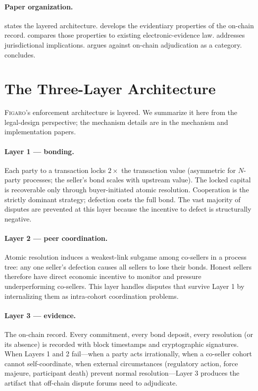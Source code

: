 \documentclass[11pt,a4paper]{article}
\theoremstyle{remark}
\newcommand{\figaro}{\textsc{Figaro}}
\begin{document}
\paragraph{Paper organization.}
 states the layered architecture.
 develops the evidentiary properties of the
on-chain record.  compares those properties to
existing electronic-evidence law.
 addresses jurisdictional implications.
 argues against on-chain adjudication
as a category.  concludes.

\section{The Three-Layer Architecture}
\label{sec:layering}

\figaro{}'s enforcement architecture is layered. We summarize it
here from the legal-design perspective; the mechanism details are
in the mechanism and implementation papers.

\paragraph{Layer 1 --- bonding.}
Each party to a transaction locks $2\times$ the transaction value
(asymmetric for $N$-party processes; the seller's bond scales with
upstream value). The locked capital is recoverable only through
buyer-initiated atomic resolution. Cooperation is the strictly
dominant strategy; defection costs the full bond. The vast
majority of disputes are prevented at this layer because the
incentive to defect is structurally negative.

\paragraph{Layer 2 --- peer coordination.}
Atomic resolution induces a weakest-link subgame among
co-sellers in a process tree: any one seller's defection causes
all sellers to lose their bonds. Honest sellers therefore have
direct economic incentive to monitor and pressure underperforming
co-sellers. This layer handles disputes that survive Layer 1 by
internalizing them as intra-cohort coordination problems.

\paragraph{Layer 3 --- evidence.}
The on-chain record. Every commitment, every bond deposit, every
resolution (or its absence) is recorded with block timestamps and
cryptographic signatures. When Layers 1 and 2 fail---when a party
acts irrationally, when a co-seller cohort cannot self-coordinate,
when external circumstances (regulatory action, force majeure,
participant death) prevent normal resolution---Layer 3 produces
the artifact that off-chain dispute forums need to adjudicate.
\end{document}
